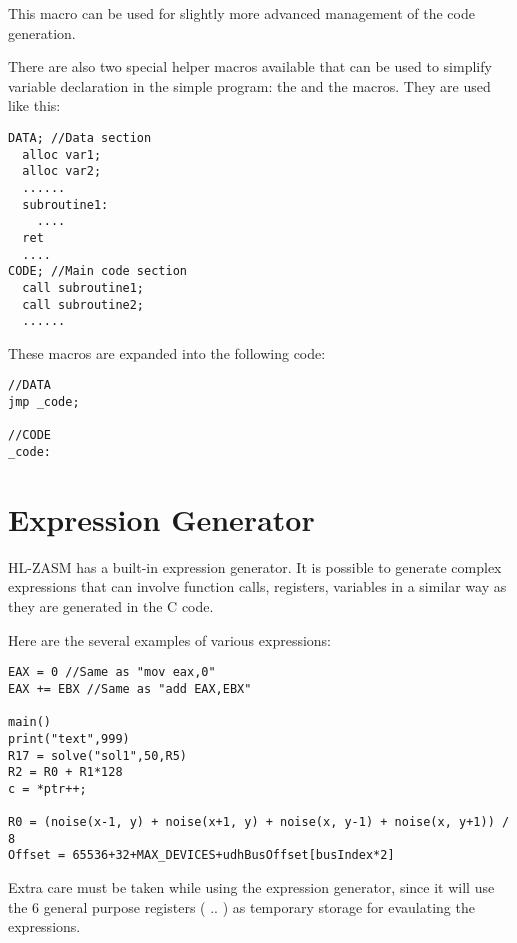 This macro can be used for slightly more advanced management of the code generation.

There are also two special helper macros available that can be used to simplify variable declaration in the simple program: the  and the  macros. They are used like this:
\begin{verbatim}
DATA; //Data section
  alloc var1;
  alloc var2;
  ......
  subroutine1:
    ....
  ret
  ....
CODE; //Main code section
  call subroutine1;
  call subroutine2;
  ......
\end{verbatim}

These macros are expanded into the following code:
\begin{verbatim}
//DATA
jmp _code;

//CODE
_code:
\end{verbatim}


\section{Expression Generator}
HL-ZASM has a built-in expression generator. It is possible to generate complex expressions that can involve function calls, registers, variables in a similar way as they are generated in the C code.

Here are the several examples of various expressions:
\begin{verbatim}
EAX = 0 //Same as "mov eax,0"
EAX += EBX //Same as "add EAX,EBX"

main()
print("text",999)
R17 = solve("sol1",50,R5)
R2 = R0 + R1*128
c = *ptr++;

R0 = (noise(x-1, y) + noise(x+1, y) + noise(x, y-1) + noise(x, y+1)) /  8
Offset = 65536+32+MAX_DEVICES+udhBusOffset[busIndex*2]
\end{verbatim}

Extra care must be taken while using the expression generator, since it will use the 6 general purpose registers ( .. ) as temporary storage for evaulating the expressions.

